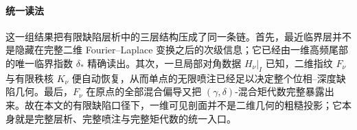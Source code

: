 \paragraph{统一读法}
这一组结果把有限缺陷层析中的三层结构压成了同一条链。首先，最近临界层并不是隐藏在完整二维 Fourier--Laplace 变换之后的次级信息；它已经由一维高频尾部的唯一临界指数 \(\delta_*\) 精确读出。其次，一旦局部对角数据 \(\left.H_\nu\right|_I\) 已知，二维指纹 \(F_\nu\) 与有限秩核 \(K_\nu\) 便自动恢复，从而单点的无限喷注已经足以决定整个位相--深度缺陷几何。最后，\(F_\nu\) 在原点的全部混合偏导又把 \((\gamma,\delta)\)-混合矩代数完整暴露出来。故在本文的有限缺陷口径下，一维可见剖面并不是二维几何的粗糙投影；它本身就是完整层析、完整喷注与完整矩代数的统一入口。

\endinput

